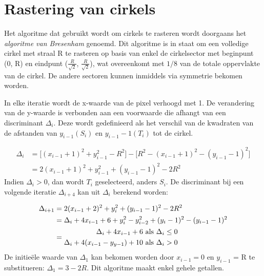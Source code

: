 \documentclass{report}
\begin{document}
	
	\chapter{Rastering van cirkels}
	Het algoritme dat gebruikt wordt om cirkels te rasteren wordt doorgaans het \textit{algoritme van Bresenham} genoemd. Dit algoritme is in staat om een volledige cirkel met straal R te rasteren op basis van enkel de cirkelsector met beginpunt (0, R) en eindpunt ($\frac{R}{\sqrt{2}}$, $\frac{R}{\sqrt{2}}$), wat overeenkomt met $1/8$ van de totale oppervlakte van de cirkel. De andere sectoren kunnen inmiddels via symmetrie bekomen worden.
	
	
	In elke iteratie wordt de x-waarde van de pixel verhoogd met 1. De verandering van de y-waarde is verbonden aan een voorwaarde die afhangt van een discriminant $\Delta_i$. Deze wordt gedefinieerd als het verschil van de kwadraten van de afstanden van $y_{i-1} (S_i)$ en $y_{i-1} - 1 (T_i)$ tot de cirkel.
	

	\begin{equation*}
	\begin{split}
			\Delta_i & = \bigg[(x_{i - 1} + 1)^2 + y_{i - 1}^2 - R^2\bigg] - \bigg[R^2 -(x_{i - 1} + 1)^2 - (y_{i - 1} - 1)^2\bigg] \\
					   & = 2(x_{i - 1} + 1)^2 + y_{i - 1}^2 + (y_{i - 1} - 1)^2 - 2R^2
	\end{split}
	\end{equation*}
	Indien $\Delta_i > 0$, dan wordt $T_i$ geselecteerd, anders $S_i$. De discriminant bij een volgende iteratie $\Delta_{i + 4}$ kan uit $\Delta_i$ berekend worden:
	
	\begin{equation*}
	\begin{split}
		\Delta_{i + 1} & = 2(x_{i - 1} + 2)^2 + y_{i}^2 + (y_{i - 1} - 1)^2 - 2R^2 \\
					   & = \Delta_i + 4x_{i - 1} + 6 + y_i^2 - y_{i - 2}^2 + (y_i - 1)^2 - (y_{i-1} - 1)^2 \\
					   & = \begin{split}
					   \Delta_i + 4x_{i - 1} + 6              & \hbox{ als } \Delta_i \leq 0 \\
					   \Delta_i + 4(x_{i - 1} - y_{y - 1}) + 10 & \hbox{ als } \Delta_i > 0
					   \end{split}
	\end{split}
	\end{equation*}
	De initieële waarde van $\Delta_1$ kan bekomen worden door $x_{i - 1} = 0$ en $y_{i - 1}$ = R te substitueren:
	$\Delta_1 = 3 - 2R$. Dit algoritme maakt enkel gehele getallen.
	
\end{document}

